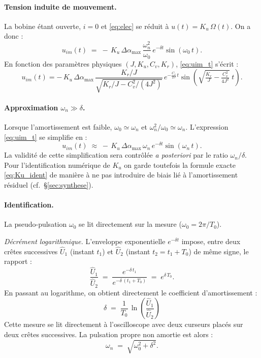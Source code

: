 \paragraph{Tension induite de mouvement.}
La bobine étant ouverte, \(i = 0\) et \eqref{eq:elec} se réduit à \(u(t) = K_u\,\Omega(t)\). On a donc :
\begin{equation}
u_{im}(t) \;=\; -\,K_u\,\Delta\alpha_{\max}\,\frac{\omega_n^2}{\omega_0}\,e^{-\delta t}\sin(\omega_0\,t).
\label{eq:uim_t}
\end{equation}
En fonction des paramètres physiques \((J, K_u, C_v, K_r)\), \eqref{eq:uim_t} s'écrit :
\begin{equation}
u_{im}(t) = -\,K_u\,\Delta\alpha_{\max}\,\frac{K_r/J}{\sqrt{K_r/J - C_v^2/(4J^2)}}\,e^{-\frac{C_v}{2J}\,t}\sin\!\left(\sqrt{\tfrac{K_r}{J} - \tfrac{C_v^2}{4J^2}}\;t\right).
\end{equation}

\paragraph{Approximation \(\omega_n \gg \delta\).}
Lorsque l'amortissement est faible, \(\omega_0 \simeq \omega_n\) et \(\omega_n^2/\omega_0 \simeq \omega_n\). L'expression \eqref{eq:uim_t} se simplifie en :
\[
u_{im}(t) \;\approx\; -\,K_u\,\Delta\alpha_{\max}\,\omega_n\,e^{-\delta t}\sin(\omega_n\,t).
\]
La validité de cette simplification sera contrôlée \emph{a posteriori} par le ratio \(\omega_n/\delta\). Pour l'identification numérique de \(K_u\) on garde toutefois la formule exacte \eqref{eq:Ku_ident} de manière à ne pas introduire de biais lié à l'amortissement résiduel (cf.\ §\ref{sec:synthese}).

\paragraph{Identification.}
La pseudo-pulsation \(\omega_0\) se lit directement sur la mesure (\(\omega_0 = 2\pi/T_0\)).

\smallskip
\noindent\emph{Décrément logarithmique.}
L'enveloppe exponentielle \(e^{-\delta t}\) impose, entre deux crêtes successives \(\hat U_1\) (instant \(t_1\)) et \(\hat U_2\) (instant \(t_2 = t_1 + T_0\)) de même signe, le rapport :
\[
\frac{\hat U_1}{\hat U_2} \;=\; \frac{e^{-\delta\,t_1}}{e^{-\delta\,(t_1+T_0)}} \;=\; e^{\delta\,T_0}.
\]
En passant au logarithme, on obtient directement le coefficient d'amortissement :
\begin{equation}
\boxed{\;\delta \;=\; \frac{1}{T_0}\,\ln\!\left(\frac{\hat U_1}{\hat U_2}\right)\;}
\label{eq:delta_decrement}
\end{equation}
Cette mesure se lit directement à l'oscilloscope avec deux curseurs placés sur deux crêtes successives. La pulsation propre non amortie est alors :
\begin{equation}
\omega_n \;=\; \sqrt{\omega_0^2 + \delta^2}.
\label{eq:omegan_ident}
\end{equation}

